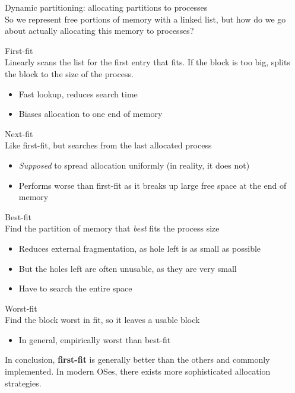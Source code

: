 \documentclass[journal, letterpaper]{IEEEtran}
\begin{document}
\begin{theory}{Dynamic partitioning: allocating partitions to processes} \\
    So we represent free portions of memory with a linked list, but how do we go about actually allocating this memory to processes?
    \begin{aside}{First-fit} \\
        Linearly scans the list for the first entry that fits. If the block is too big, splits the block to the size of the process.
        \begin{itemize}
            \item[\ding{51}] Fast lookup, reduces search time
            \item[\ding{55}] Biases allocation to one end of memory
        \end{itemize}
    \end{aside}
    \begin{aside}{Next-fit} \\
        Like first-fit, but searches from the last allocated process
        \begin{itemize}
            \item[\ding{51}\ding{55}] \textit{Supposed} to spread allocation uniformly (in reality, it does not)
            \item[\ding{55}] Performs worse than first-fit as it breaks up large free space at the end of memory
        \end{itemize}
    \end{aside}
    \begin{aside}{Best-fit} \\
        Find the partition of memory that \textit{best} fits the process size
        \begin{itemize}
            \item[\ding{51}] Reduces external fragmentation, as hole left is as small as possible
            \item[\ding{55}] But the holes left are often unusable, as they are very small
            \item[\ding{55}] Have to search the entire space
        \end{itemize}
    \end{aside}
    \begin{aside}{Worst-fit} \\
        Find the block worst in fit, so it leaves a usable block
        \begin{itemize}
            \item[\ding{55}] In general, empirically worst than best-fit
        \end{itemize}
    \end{aside}
    In conclusion, \textbf{first-fit} is generally better than the others and commonly implemented. In modern OSes, there exists more sophisticated allocation strategies.
\end{theory}
\end{document}
